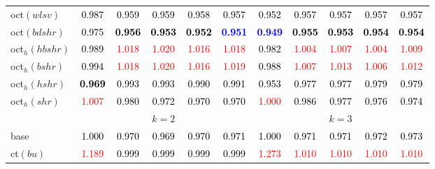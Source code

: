 \begin{tabular}[t]{l|>{}cccc>{}c|ccccc}
oct$(wlsv)$ & \textcolor{black}{0.987} & \textcolor{black}{0.959} & \textcolor{black}{0.959} & \textcolor{black}{0.958} & \textcolor{black}{0.957} & \textcolor{black}{0.952} & \textcolor{black}{0.957} & \textcolor{black}{0.957} & \textcolor{black}{0.957} & \textcolor{black}{0.957}\\
oct$(bdshr)$ & \textcolor{black}{0.975} & \textcolor{black}{\textbf{0.956}} & \textcolor{black}{\textbf{0.953}} & \textcolor{black}{\textbf{0.952}} & \textcolor{blue}{\textbf{0.951}} & \textcolor{blue}{\textbf{0.949}} & \textcolor{black}{\textbf{0.955}} & \textcolor{black}{\textbf{0.953}} & \textcolor{black}{\textbf{0.954}} & \textcolor{black}{\textbf{0.954}}\\
oct$_h(hbshr)$ & \textcolor{black}{0.989} & \textcolor{red}{1.018} & \textcolor{red}{1.020} & \textcolor{red}{1.016} & \textcolor{red}{1.018} & \textcolor{black}{0.982} & \textcolor{red}{1.004} & \textcolor{red}{1.007} & \textcolor{red}{1.004} & \textcolor{red}{1.009}\\
oct$_h(bshr)$ & \textcolor{black}{0.994} & \textcolor{red}{1.018} & \textcolor{red}{1.020} & \textcolor{red}{1.016} & \textcolor{red}{1.019} & \textcolor{black}{0.988} & \textcolor{red}{1.007} & \textcolor{red}{1.013} & \textcolor{red}{1.006} & \textcolor{red}{1.012}\\
oct$_h(hshr)$ & \textcolor{black}{\textbf{0.969}} & \textcolor{black}{0.993} & \textcolor{black}{0.993} & \textcolor{black}{0.990} & \textcolor{black}{0.991} & \textcolor{black}{0.953} & \textcolor{black}{0.977} & \textcolor{black}{0.977} & \textcolor{black}{0.979} & \textcolor{black}{0.979}\\
oct$_h(shr)$ & \textcolor{red}{1.007} & \textcolor{black}{0.980} & \textcolor{black}{0.972} & \textcolor{black}{0.970} & \textcolor{black}{0.970} & \textcolor{red}{1.000} & \textcolor{black}{0.986} & \textcolor{black}{0.977} & \textcolor{black}{0.976} & \textcolor{black}{0.974}\\
\addlinespace[0.3em]
\multicolumn{1}{c}{} & \multicolumn{5}{c}{\textbf{$k = 2$}} & \multicolumn{5}{c}{\textbf{$k = 3$}}\\
base & \textcolor{black}{1.000} & \textcolor{black}{0.970} & \textcolor{black}{0.969} & \textcolor{black}{0.970} & \textcolor{black}{0.971} & \textcolor{black}{1.000} & \textcolor{black}{0.971} & \textcolor{black}{0.971} & \textcolor{black}{0.972} & \textcolor{black}{0.973}\\
ct$(bu)$ & \textcolor{red}{1.189} & \textcolor{black}{0.999} & \textcolor{black}{0.999} & \textcolor{black}{0.999} & \textcolor{black}{0.999} & \textcolor{red}{1.273} & \textcolor{red}{1.010} & \textcolor{red}{1.010} & \textcolor{red}{1.010} & \textcolor{red}{1.010}\\

\end{tabular}
